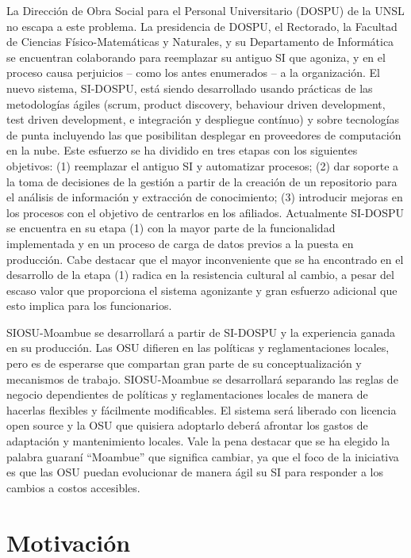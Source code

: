 La Dirección de Obra Social para el Personal Universitario (DOSPU) de la UNSL no escapa a este problema. La presidencia de DOSPU, el Rectorado, la Facultad de Ciencias Físico-Matemáticas y Naturales, y su Departamento de Informática se encuentran colaborando para reemplazar su antiguo SI que agoniza, y en el proceso causa perjuicios – como los antes enumerados – a la organización. El nuevo sistema, SI-DOSPU, está siendo desarrollado usando prácticas de las metodologías ágiles (scrum, product discovery, behaviour driven development, test driven development, e integración y despliegue contínuo) y sobre  tecnologías de punta incluyendo las que posibilitan desplegar en proveedores de computación en la nube. Este esfuerzo se ha dividido en tres etapas con los siguientes objetivos: (1) reemplazar el antiguo SI y automatizar procesos; (2) dar soporte a la toma de decisiones de la gestión a partir de la creación de un repositorio para el análisis de información y extracción de conocimiento; (3) introducir mejoras en los procesos con el objetivo de centrarlos en los afiliados. Actualmente SI-DOSPU se encuentra en su etapa (1) con la mayor parte de la funcionalidad implementada y en un proceso de carga de datos previos a la puesta en producción. Cabe destacar que el mayor inconveniente que se ha encontrado en el desarrollo de la etapa (1) radica en la resistencia cultural al cambio, a pesar del escaso valor que proporciona el sistema agonizante y gran esfuerzo adicional que esto implica para los funcionarios.

SIOSU-Moambue se desarrollará a partir de SI-DOSPU y la experiencia ganada en su producción. Las OSU difieren en las políticas y reglamentaciones locales, pero es de esperarse que compartan gran parte de su conceptualización y mecanismos de trabajo. SIOSU-Moambue se desarrollará separando las reglas de negocio dependientes de políticas y reglamentaciones locales de manera de hacerlas flexibles y fácilmente modificables. El sistema será liberado con licencia open source y la OSU que quisiera adoptarlo deberá afrontar los gastos de adaptación y mantenimiento locales. Vale la pena destacar que se ha elegido la palabra guaraní “Moambue” que significa cambiar, ya que el foco de la iniciativa es que las OSU puedan evolucionar de manera ágil su SI para responder a los cambios a costos accesibles.

\section{Motivación}

